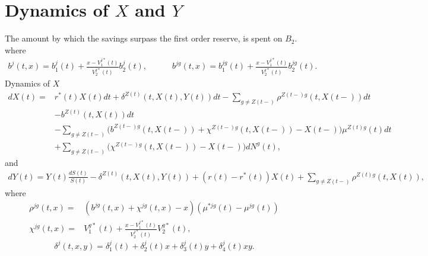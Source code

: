 \documentclass[12pt]{article}
\theoremstyle{my_thm}
\begin{document}
\section{Dynamics of $X$ and $Y$}\label{seq:Dyn}

The amount by which the savings surpass the first order reserve, is spent on $B_2$. 
where
\begin{gather*}
b^j(t,x)=b_1^j(t)+\frac{x-V_1^{j*}(t)}{V_2^{j*}(t)}b^j_2(t),
\qquad \quad
b^{jg}(t,x)=b_1^{jg}(t)+\frac{x-V_1^{j*}(t)}{V_2^{j*}(t)}b^{jg}_2(t).
\end{gather*}
Dynamics of $X$
\begin{align*}
dX(t)=&
r^*(t)X(t)dt
 +\delta^{Z(t)}(t,X(t),Y(t))  dt- \sum_{g \neq Z(t-)} \rho^{Z(t-)g}(t,X(t-)) dt
 \nonumber 
\\
\nonumber
&- b^{Z(t)}(t,X(t)) dt
\\
&- \sum_{g\neq Z(t-)}\bigg(b^{Z(t-)g}(t,X(t-))+\chi^{Z(t-)g}(t,X(t-))-X(t-) \bigg) \mu^{Z(t)g}(t)dt
\\
&+ \sum_{g\neq Z(t-)}\bigg(\chi^{Z(t-)g}(t,X(t-))-X(t-) \bigg)  dN^g(t),
\end{align*}
and
\begin{align*}
dY(t)=Y(t)\frac{dS(t)}{S(t)}-\delta^{Z(t)}(t,X(t),Y(t)) + (r(t)-r^*(t)) X(t) + \sum_{g \neq Z(t-)} \rho^{Z(t)g}(t,X(t)),
\end{align*}
where
\begin{align*}
\rho^{jg}(t,x)=&(b^{jg}(t,x)+ \chi^{jg}(t,x)-x) (\mu^{*jg}(t)-\mu^{jg}(t))
\\
\chi^{jg}(t,x)=& V^{g*}_1(t) + \frac{x-V^{j*}_1(t)}{V^{j*}_2(t)}V^{g*}_2(t),
\end{align*}
\begin{equation}
\delta^j(t,x,y)=\delta_1^j(t)+\delta_2^j(t)x+\delta_3^j(t)y+\delta_4^j(t)xy.
\end{equation}
\end{document}
